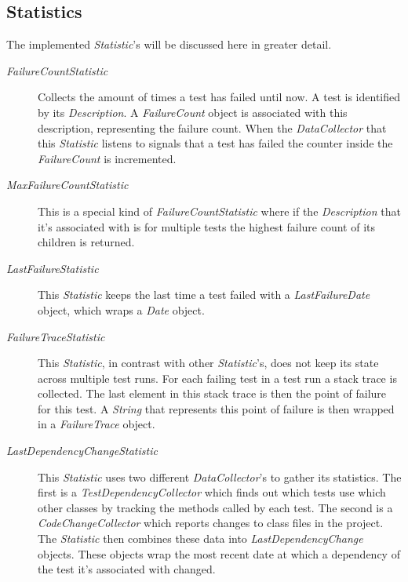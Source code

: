 \documentclass[i2]{oss}
\newcommand{\class}[1]{\emph{#1}}
\begin{document}

\subsection{Statistics}
\label{subssec: statistics}

The implemented \class{Statistic}'s will be discussed here in greater 
detail.
\begin{description}

\item [\class{FailureCountStatistic}] Collects the amount of times a test 
has failed until now.
A test is identified by its \class{Description}.
A \class{FailureCount} object is associated with this description,
representing the failure count.
When the \class{DataCollector} that this \class{Statistic} listens to
signals that a test has failed the counter inside the 
\class{FailureCount} is incremented.

\item [\class{MaxFailureCountStatistic}] This is a special kind of 
\class{FailureCountStatistic} where if the \class{Description} that it's
associated with is for multiple tests the highest failure count of its 
children is returned.

\item [\class{LastFailureStatistic}] This \class{Statistic} keeps the 
last time a test failed with a \class{LastFailureDate} object, which
wraps a \class{Date} object.

\item [\class{FailureTraceStatistic}] This \class{Statistic}, in contrast
with other \class{Statistic}'s, does not keep its state across multiple
test runs.
For each failing test in a test run a stack trace is collected. 
The last element in this stack trace is then the point of failure for 
this test.
A \class{String} that represents this point of failure is then wrapped
in a \class{FailureTrace} object.

\item [\class{LastDependencyChangeStatistic}] This \class{Statistic} uses
two different \class{DataCollector}'s to gather its statistics.
The first is a \class{TestDependencyCollector} which finds out which 
tests use which other classes by tracking the methods called by each
test.
The second is a \class{CodeChangeCollector} which reports changes to
class files in the project.
The \class{Statistic} then combines these data into 
\class{LastDependencyChange} objects.
These objects wrap the most recent date at which a dependency of the 
test it's associated with changed.

\end{description}
\end{document}
